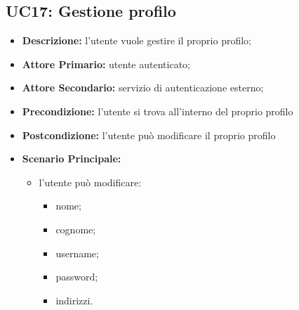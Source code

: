 \subsection{UC17: Gestione profilo}
\label{sec:UC17}
\begin{itemize}
    \item \textbf{Descrizione:} l'utente vuole gestire il proprio profilo;
    \item \textbf{Attore Primario:} utente autenticato;
    \item \textbf{Attore Secondario:} servizio di autenticazione esterno;
    \item \textbf{Precondizione:} l'utente si trova all'interno del proprio profilo
    \item \textbf{Postcondizione:} l'utente può modificare il proprio profilo
    \item \textbf{Scenario Principale:}
          \begin{itemize}
              \item  l'utente può modificare:
                    \begin{itemize}
                        \item nome;
                        \item cognome;
                        \item username;
                        \item password;
                        \item indirizzi.
                    \end{itemize}
          \end{itemize}
\end{itemize}